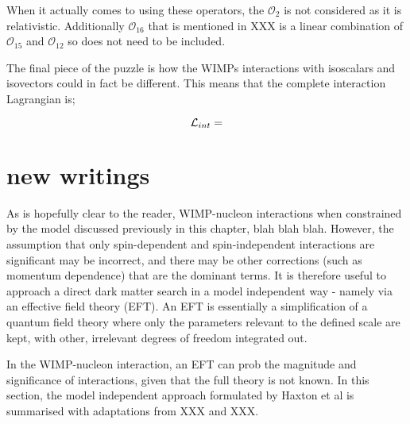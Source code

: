 \par
When it actually comes to using these operators, the $\mathcal{O}_{2}$ is not considered as it is relativistic. 
Additionally $\mathcal{O}_{16}$ that is mentioned in XXX is a linear combination of $\mathcal{O}_{15}$ and $\mathcal{O}_{12}$ so does not need to be included.

\par
The final piece of the puzzle is how the WIMPs interactions with isoscalars and isovectors could in fact be different.
This means that the complete interaction Lagrangian is;

\begin{equation}
    \operatorname{\mathcal{L}}_{int} = 
    \label{eq:HENR_Interaction_Lagrangian}
\end{equation}

\section{new writings}
\par
As is hopefully clear to the reader, WIMP-nucleon interactions when constrained by the model discussed previously in this chapter, blah blah blah.
However, the assumption that only spin-dependent and spin-independent interactions are significant may be incorrect, and there may be other corrections (such as momentum dependence) that are the dominant terms.
It is therefore useful to approach a direct dark matter search in a model independent way - namely via an effective field theory (EFT).
An EFT is essentially a simplification of a quantum field theory where only the parameters relevant to the defined scale are kept, with other, irrelevant degrees of freedom integrated out.

\par
In the WIMP-nucleon interaction, an EFT can prob the magnitude and significance of interactions, given that the full theory is not known.
In this section, the model independent approach formulated by Haxton et al is summarised with adaptations from XXX and XXX.

\par



